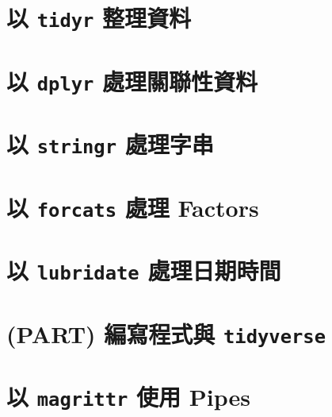 \documentclass[
]{book}
\theoremstyle{definition}
\theoremstyle{remark}
\begin{document}
\hypertarget{tidyr}{%
\chapter{\texorpdfstring{以 \texttt{tidyr} 整理資料}{以 tidyr 整理資料}}\label{tidyr}}

\hypertarget{ux4ee5-dplyr-ux8655ux7406ux95dcux806fux6027ux8cc7ux6599}{%
\chapter{\texorpdfstring{以 \texttt{dplyr} 處理關聯性資料}{以 dplyr 處理關聯性資料}}\label{ux4ee5-dplyr-ux8655ux7406ux95dcux806fux6027ux8cc7ux6599}}

\hypertarget{stringr}{%
\chapter{\texorpdfstring{以 \texttt{stringr} 處理字串}{以 stringr 處理字串}}\label{stringr}}

\hypertarget{ux4ee5-forcats-ux8655ux7406-factors}{%
\chapter{\texorpdfstring{以 \texttt{forcats} 處理 Factors}{以 forcats 處理 Factors}}\label{ux4ee5-forcats-ux8655ux7406-factors}}

\hypertarget{ux4ee5-lubridate-ux8655ux7406ux65e5ux671fux6642ux9593}{%
\chapter{\texorpdfstring{以 \texttt{lubridate} 處理日期時間}{以 lubridate 處理日期時間}}\label{ux4ee5-lubridate-ux8655ux7406ux65e5ux671fux6642ux9593}}

\hypertarget{part-ux7de8ux5bebux7a0bux5f0fux8207-tidyverse}{%
\chapter*{\texorpdfstring{(PART) 編寫程式與 \texttt{tidyverse}}{(PART) 編寫程式與 tidyverse}}\label{part-ux7de8ux5bebux7a0bux5f0fux8207-tidyverse}}

\hypertarget{ux4ee5-magrittr-ux4f7fux7528-pipes}{%
\chapter{\texorpdfstring{以 \texttt{magrittr} 使用 Pipes}{以 magrittr 使用 Pipes}}\label{ux4ee5-magrittr-ux4f7fux7528-pipes}}
\end{document}
